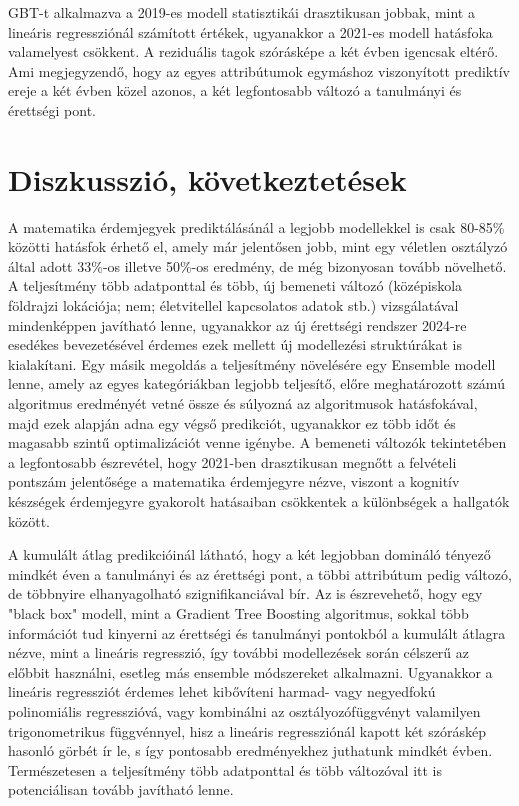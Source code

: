 \documentclass[12pt]{article}
\begin{document}
\noindent GBT-t alkalmazva a 2019-es modell statisztikái drasztikusan jobbak, mint a lineáris regressziónál számított értékek, ugyanakkor a 2021-es modell hatásfoka valamelyest csökkent. A reziduális tagok szórásképe a két évben igencsak eltérő. Ami megjegyzendő, hogy az egyes attribútumok egymáshoz viszonyított prediktív ereje a két évben közel azonos, a két legfontosabb változó a tanulmányi és érettségi pont. 

\newpage 

\section{Diszkusszió, következtetések}

A matematika érdemjegyek prediktálásánál a legjobb modellekkel is csak 80-85\% közötti hatásfok érhető el, amely már jelentősen jobb, mint egy véletlen osztályzó által adott 33\%-os illetve 50\%-os eredmény, de még bizonyosan tovább növelhető. A teljesítmény több adatponttal és több, új bemeneti változó (középiskola földrajzi lokációja; nem; életvitellel kapcsolatos adatok stb.) vizsgálatával mindenképpen javítható lenne, ugyanakkor az új érettségi rendszer 2024-re esedékes bevezetésével érdemes ezek mellett új modellezési struktúrákat is kialakítani. Egy másik megoldás a teljesítmény növelésére egy Ensemble modell lenne, amely az egyes kategóriákban legjobb teljesítő, előre meghatározott számú algoritmus eredményét vetné össze és súlyozná az algoritmusok hatásfokával, majd ezek alapján adna egy végső predikciót, ugyanakkor ez több időt és magasabb szintű optimalizációt venne igénybe. A bemeneti változók tekintetében a legfontosabb észrevétel, hogy 2021-ben drasztikusan megnőtt a felvételi pontszám jelentősége a matematika érdemjegyre nézve, viszont a kognitív készségek érdemjegyre gyakorolt hatásaiban csökkentek a különbségek a hallgatók között.

A kumulált átlag predikcióinál látható, hogy a két legjobban domináló tényező mindkét éven a tanulmányi és az érettségi pont, a többi attribútum pedig változó, de többnyire elhanyagolható szignifikanciával bír. Az is észrevehető, hogy egy "black box" modell, mint a Gradient Tree Boosting algoritmus, sokkal több információt tud kinyerni az érettségi és tanulmányi pontokból a kumulált átlagra nézve, mint a lineáris regresszió, így további modellezések során célszerű az előbbit használni, esetleg más ensemble módszereket alkalmazni. Ugyanakkor a lineáris regressziót érdemes lehet kibővíteni harmad- vagy negyedfokú polinomiális regresszióvá, vagy kombinálni az osztályozófüggvényt valamilyen trigonometrikus függvénnyel, hisz a lineáris regressziónál kapott két szóráskép hasonló görbét ír le, s így pontosabb eredményekhez juthatunk mindkét évben. Természetesen a teljesítmény több adatponttal és több változóval itt is potenciálisan tovább javítható lenne. 
\end{document}
